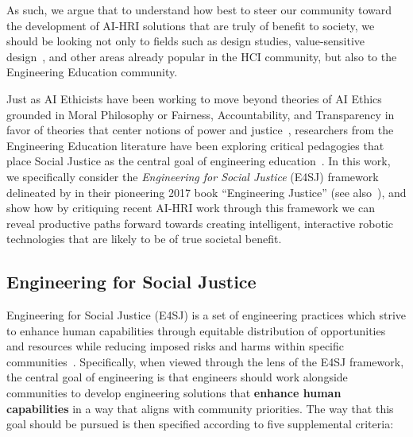 \documentclass[letterpaper]{article} %
\begin{document}
As such, we argue that to understand how best to steer our community toward the development of AI-HRI solutions that are truly of benefit to society, we should be looking not only to fields such as design studies, value-sensitive design~\cite{friedman1996value}, and other areas already popular in the HCI community, but also to the Engineering Education community. 

Just as AI Ethicists have been working to move beyond theories of AI Ethics grounded in Moral Philosophy or Fairness, Accountability, and Transparency in favor of theories that center notions of power and justice~\cite{bennett2020point,le2020we}, researchers from the Engineering Education literature have been exploring critical pedagogies that place Social Justice as the central goal of engineering education~\cite{leydens2014design,leydens2017engineering,nieusma2013engineering,riley2008engineering,winberg2017using}.
%
In this work, we specifically consider the \textit{Engineering for Social Justice} (E4SJ) framework delineated by \citet{leydens2017engineering} in their pioneering 2017 book ``Engineering Justice'' (see also~\citet{leydens2017confronting,leydens2016making}), and show how by critiquing recent AI-HRI work through this framework we can reveal productive paths forward towards creating intelligent, interactive robotic technologies that are likely to be of true societal benefit.


\subsection{Engineering for Social Justice}
Engineering for Social Justice (E4SJ) is a set of engineering practices which strive to enhance
human capabilities through equitable distribution of opportunities and resources while reducing imposed risks and harms within specific communities~\cite{leydens2017engineering}.
%
Specifically, when viewed through the lens of the E4SJ framework, the central goal of engineering is that engineers should work alongside communities to develop engineering solutions that \textbf{enhance human capabilities} in a way that aligns with community priorities. The way that this goal should be pursued is then specified according to five supplemental criteria:
\end{document}
